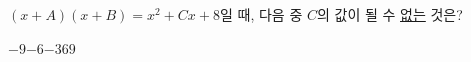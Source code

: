 $(x+A)(x+B)=x^2+Cx+8$일 때, 다음 중 $C$의 값이 될 수 \underline{없는} 것은? 
\begin{choices32}{$-9$}{$-6$}{$-3$}{$6$}{$9$}\end{choices32}
